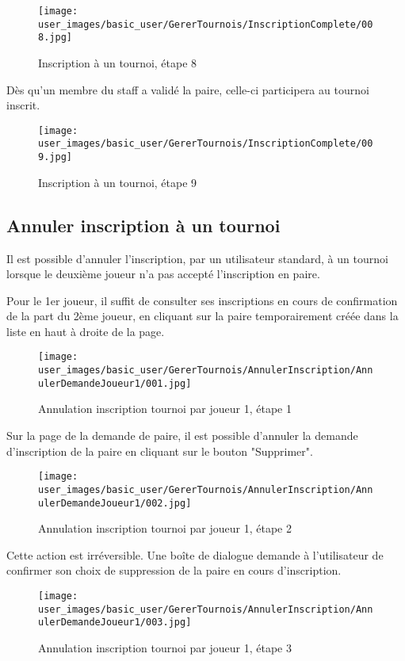 \begin{figure}[H]
\centering
\texttt{[image: user\_images/basic\_user/GererTournois/InscriptionComplete/008.jpg]}
\caption{Inscription à un tournoi, étape 8}
\end{figure}

Dès qu'un membre du staff a validé la paire, celle-ci participera au tournoi inscrit.

\begin{figure}[H]
\centering
\texttt{[image: user\_images/basic\_user/GererTournois/InscriptionComplete/009.jpg]}
\caption{Inscription à un tournoi, étape 9}
\end{figure}

\subsection{Annuler inscription à un tournoi}

Il est possible d'annuler l'inscription, par un utilisateur standard, à un tournoi lorsque le deuxième joueur n'a pas accepté l'inscription en paire.\newline

Pour le 1er joueur, il suffit de consulter ses inscriptions en cours de confirmation de la part du 2ème joueur, en cliquant sur la paire temporairement créée dans la liste en haut à droite de la page.

\begin{figure}[H]
\centering
\texttt{[image: user\_images/basic\_user/GererTournois/AnnulerInscription/AnnulerDemandeJoueur1/001.jpg]}
\caption{Annulation inscription tournoi par joueur 1, étape 1}
\end{figure}

Sur la page de la demande de paire, il est possible d'annuler la demande d'inscription de la paire en cliquant sur le bouton "Supprimer".

\begin{figure}[H]
\centering
\texttt{[image: user\_images/basic\_user/GererTournois/AnnulerInscription/AnnulerDemandeJoueur1/002.jpg]}
\caption{Annulation inscription tournoi par joueur 1, étape 2}
\end{figure}

Cette action est irréversible. Une boîte de dialogue demande à l'utilisateur de confirmer son choix de suppression de la paire en cours d'inscription.

\begin{figure}[H]
\centering
\texttt{[image: user\_images/basic\_user/GererTournois/AnnulerInscription/AnnulerDemandeJoueur1/003.jpg]}
\caption{Annulation inscription tournoi par joueur 1, étape 3}
\end{figure}

